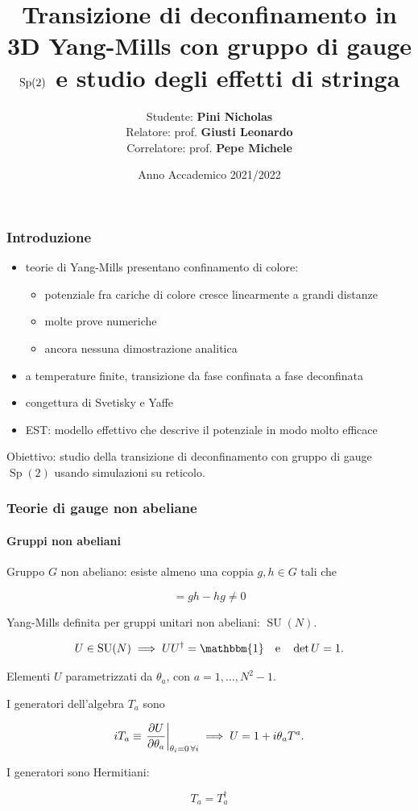 \documentclass{beamer}
\title{Transizione di deconfinamento in 3D Yang-Mills con gruppo di gauge $\Sp(2)$ e studio degli effetti di stringa}
\author{\texorpdfstring{Studente: \textbf{Pini Nicholas}\\ \small Relatore: prof. \textbf{Giusti Leonardo}\\ \small Correlatore: prof. \textbf{Pepe Michele}}{Pini Nicholas}}
\institute
{
  Facoltà di Fisica Magistrale\\
  Università degli Studi di Milano Bicocca
}
\date
{Anno Accademico 2021/2022}
\newcommand{\SU}{\operatorname{SU}}
\newcommand{\Sp}{\operatorname{Sp}}
\newcommand{\id}{\mathbbm{1}}
\begin{document}
\beamertemplatenavigationsymbolsempty

\frame{\titlepage}


\begin{frame}
	\frametitle{Introduzione}

	\begin{itemize}
		\item teorie di Yang-Mills presentano \alert{confinamento di colore}: 
			\begin{itemize}
				\item potenziale fra cariche di colore cresce linearmente a grandi distanze
				\item molte prove numeriche
				\item ancora nessuna dimostrazione analitica
			\end{itemize}
		\item a temperature finite, transizione da fase confinata a fase deconfinata
		\item congettura di Svetisky e Yaffe
		\item EST: modello effettivo che descrive il potenziale in modo molto efficace 
	\end{itemize}

	\alert{Obiettivo}: studio della transizione di deconfinamento con gruppo di gauge $\Sp(2)$ usando simulazioni su reticolo.

\end{frame}

\begin{frame}
	\frametitle{Teorie di gauge non abeliane}
	\framesubtitle{Gruppi non abeliani}
	
	Gruppo $G$ \alert{non abeliano}: esiste almeno una coppia $g,h \in G$ tali che

	\begin{equation*}
		[g, h] = gh - hg \ne 0
	\end{equation*}

	Yang-Mills definita per gruppi unitari non abeliani: $\SU(N)$.

	\begin{equation*}
		U \in \SU(N) \implies UU^\dagger = \id \qq{e} \det U = 1.
	\end{equation*}

	Elementi $U$ parametrizzati da $\theta_a$, con $a = 1,\dots,N^2 - 1$. 

	I generatori dell'algebra $T_a$ sono

	\begin{equation*}
		iT_a \equiv \eval{\pdv{U}{\theta_a}}_{\theta_i = 0\,\forall i} \implies U = 1 + i \theta_aT^a.
	\end{equation*}

	I generatori sono Hermitiani:

	\begin{equation*}
		T_a = T_a^\dagger
	\end{equation*}

\end{frame}
\end{document}
